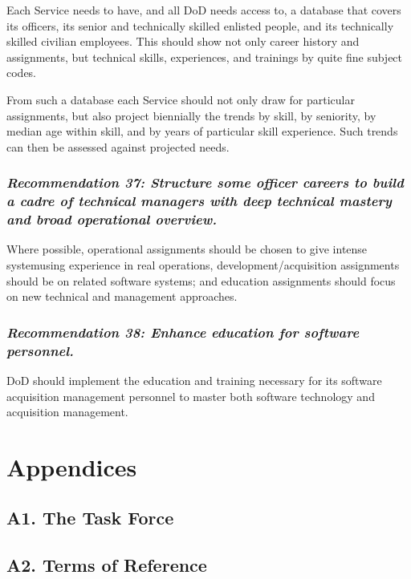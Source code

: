 \documentclass[12pt,final]{article}
\begin{document}
Each Service needs to have, and all DoD needs access to, a database that covers
its officers, its senior and technically skilled enlisted people, and its
technically skilled civilian employees. This should show not only career
history and assignments, but technical skills, experiences, and trainings by
quite fine subject codes.

From such a database each Service should not only draw for particular
assignments, but also project biennially the trends by skill, by seniority, by
median age within skill, and by years of particular skill experience. Such
trends can then be assessed against projected needs.

\label{rec:37}
\subsubsection*{\textit{Recommendation 37: Structure some officer careers to
build a cadre of technical managers with deep technical mastery and broad
operational overview.}}

Where possible, operational assignments should be chosen to give intense
systemusing experience in real operations, development/acquisition assignments
should be on related software systems; and education assignments should focus
on new technical and management approaches.

\label{rec:38}
\subsubsection*{\textit{Recommendation 38: Enhance education for software
personnel.}}

DoD should implement the education and training necessary for its software
acquisition management personnel to master both software technology and
acquisition management.

\newpage
\section{Appendices}

\subsection*{A1. The Task Force}

\subsection*{A2. Terms of Reference}
\end{document}
